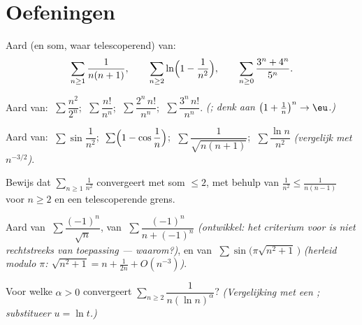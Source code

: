 \section{Oefeningen}

\begin{exercise}[$\star$]\label{exo:b1:series:1}
Aard (en som, waar telescoperend) van:
\[
\sum_{n\geq1} \frac{1}{n(n+1)},
\qquad
\sum_{n\geq2} \ln\Bigl(1 - \frac{1}{n^2}\Bigr),
\qquad
\sum_{n\geq0} \frac{3^n + 4^n}{5^n} .
\]
\end{exercise}

\begin{exercise}[$\star$]\label{exo:b1:series:2}
Aard van: $\;\sum \dfrac{n^2}{2^n}$; $\;\sum \dfrac{n!}{n^n}$;
$\;\sum \dfrac{2^n\,n!}{n^n}$; $\;\sum \dfrac{3^n\,n!}{n^n}$.
\emph{(; denk aan $\bigl(1 + \frac1n\bigr)^n \to
\eu$.)}
\end{exercise}

\begin{exercise}[$\star$]\label{exo:b1:series:3}
Aard van: $\;\sum \sin\dfrac{1}{n^2}$; $\;\sum \Bigl(1 -
\cos\dfrac1n\Bigr)$; $\;\sum \dfrac{1}{\sqrt{n(n+1)}}$; $\;\sum
\dfrac{\ln n}{n^2}$ \emph{(vergelijk met $n^{-3/2}$)}.
\end{exercise}

\begin{exercise}[$\star$]\label{exo:b1:series:4}
Bewijs dat $\sum_{n\geq1} \frac{1}{n^2}$ convergeert met som $\leq
2$, met behulp van $\frac{1}{n^2} \leq \frac{1}{n(n-1)}$ voor $n
\geq 2$ en een telescoperende grens.
\end{exercise}

\begin{exercise}[$\star\star$]\label{exo:b1:series:5}
Aard van $\;\sum \dfrac{(-1)^n}{\sqrt n}$, van $\;\sum
\dfrac{(-1)^n}{n + (-1)^n}$ \emph{(ontwikkel: het criterium voor
 is niet rechtstreeks van toepassing ---
waarom?)}, en van $\;\sum \sin\bigl(\pi\sqrt{n^2+1}\,\bigr)$
\emph{(herleid modulo $\pi$: $\sqrt{n^2+1} = n + \frac{1}{2n} +
O(n^{-3})$)}.
\end{exercise}

\begin{exercise}[$\star\star$]\label{exo:b1:series:6}
Voor welke $\alpha > 0$ convergeert $\sum_{n \geq 2} \dfrac{1}{n
(\ln n)^{\alpha}}$? \emph{(Vergelijking met een ;
substitueer $u = \ln t$.)}
\end{exercise}

